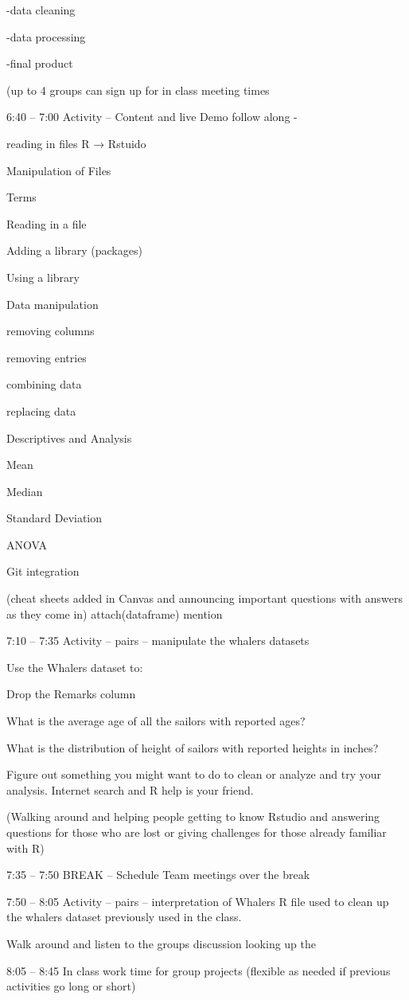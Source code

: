 \documentclass[]{article}
\begin{document}
-data cleaning

-data processing

-final product

(up to 4 groups can sign up for in class meeting times

6:40 -- 7:00 Activity -- Content and live Demo follow along -

reading in files R → Rstuido

Manipulation of Files

Terms

Reading in a file

Adding a library (packages)

Using a library

Data manipulation

removing columns

removing entries

combining data

replacing data

Descriptives and Analysis

Mean

Median

Standard Deviation

ANOVA

Git integration

(cheat sheets added in Canvas and announcing important questions with
answers as they come in) attach(dataframe) mention

7:10 -- 7:35 Activity -- pairs -- manipulate the whalers datasets

Use the Whalers dataset to:

Drop the Remarks column

What is the average age of all the sailors with reported ages?

What is the distribution of height of sailors with reported heights in
inches?

Figure out something you might want to do to clean or analyze and try
your analysis. Internet search and R help is your friend.

(Walking around and helping people getting to know Rstudio and answering
questions for those who are lost or giving challenges for those already
familiar with R)

7:35 -- 7:50 BREAK -- Schedule Team meetings over the break

7:50 -- 8:05 Activity -- pairs -- interpretation of Whalers R file used
to clean up the whalers dataset previously used in the class.

Walk around and listen to the groups discussion looking up the

8:05 -- 8:45 In class work time for group projects (flexible as needed
if previous activities go long or short)
\end{document}
